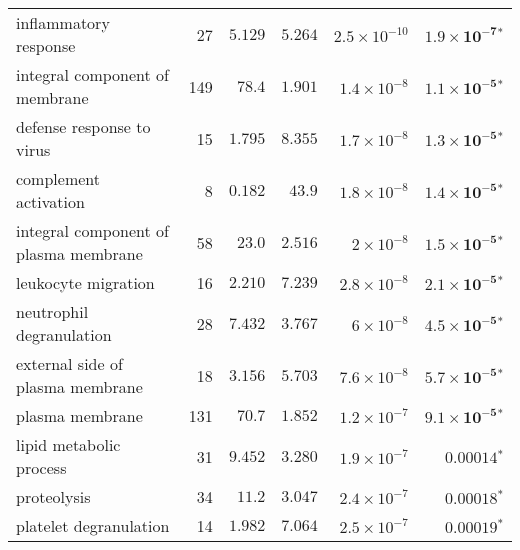 \begin{longtable}{|l|r|r|r|r|r|}
    inflammatory response                             & 27                      & $ 5.129$                & $ 5.264$   & $2.5\times 10^{-10}$ & $\bm{1.9\times 10^{-7}{^*}}$  \\
    integral component of membrane                    & 149                     & $  78.4$                  & $ 1.901$   & $1.4\times 10^{-8}$  & $\bm{1.1\times 10^{-5}{^*}}$  \\
    defense response to virus                         & 15                      & $ 1.795$                & $ 8.355$   & $1.7\times 10^{-8}$  & $\bm{1.3\times 10^{-5}{^*}}$  \\
    complement activation                             & 8                       & $ 0.182$                & $  43.9$     & $1.8\times 10^{-8}$  & $\bm{1.4\times 10^{-5}{^*}}$  \\
    integral component of plasma membrane             & 58                      & $  23.0$                  & $ 2.516$   & $ 2\times 10^{-8}$   & $\bm{1.5\times 10^{-5}{^*}}$  \\
    leukocyte migration                               & 16                      & $ 2.210$                & $ 7.239$   & $2.8\times 10^{-8}$  & $\bm{2.1\times 10^{-5}{^*}}$  \\
    neutrophil degranulation                          & 28                      & $ 7.432$                & $ 3.767$   & $ 6\times 10^{-8}$   & $\bm{4.5\times 10^{-5}{^*}}$  \\
    external side of plasma membrane                  & 18                      & $ 3.156$                & $ 5.703$   & $7.6\times 10^{-8}$  & $\bm{5.7\times 10^{-5}{^*}}$  \\
    plasma membrane                                   & 131                     & $  70.7$                  & $ 1.852$   & $1.2\times 10^{-7}$  & $\bm{9.1\times 10^{-5}{^*}}$  \\
    lipid metabolic process                           & 31                      & $ 9.452$                & $ 3.280$   & $1.9\times 10^{-7}$  & $\bm{0.00014{^*}}$            \\
    proteolysis                                       & 34                      & $  11.2$                  & $ 3.047$   & $2.4\times 10^{-7}$  & $\bm{0.00018{^*}}$            \\
    platelet degranulation                            & 14                      & $ 1.982$                & $ 7.064$   & $2.5\times 10^{-7}$  & $\bm{0.00019{^*}}$            \\

\end{longtable}
